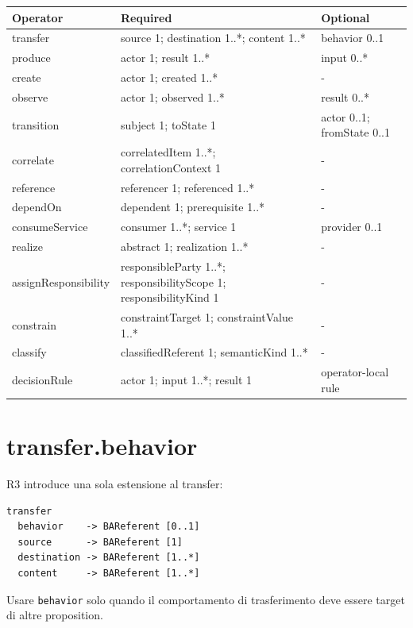 \documentclass[11pt,a4paper]{article}
\newcommand{\code}[1]{\nolinkurl{#1}}
\begin{document}
\begin{longtable}{L{0.19\textwidth}L{0.33\textwidth}L{0.34\textwidth}}
\toprule
\textbf{Operator} & \textbf{Required} & \textbf{Optional} \\
\midrule\endhead
transfer & source 1; destination 1..*; content 1..* & behavior 0..1 \\
produce & actor 1; result 1..* & input 0..* \\
create & actor 1; created 1..* & - \\
observe & actor 1; observed 1..* & result 0..* \\
transition & subject 1; toState 1 & actor 0..1; fromState 0..1 \\
correlate & correlatedItem 1..*; correlationContext 1 & - \\
reference & referencer 1; referenced 1..* & - \\
dependOn & dependent 1; prerequisite 1..* & - \\
consumeService & consumer 1..*; service 1 & provider 0..1 \\
realize & abstract 1; realization 1..* & - \\
assignResponsibility & responsibleParty 1..*; responsibilityScope 1; responsibilityKind 1 & - \\
constrain & constraintTarget 1; constraintValue 1..* & - \\
classify & classifiedReferent 1; semanticKind 1..* & - \\
decisionRule & actor 1; input 1..*; result 1 & operator-local rule \\
\bottomrule
\end{longtable}

\section{transfer.behavior}

R3 introduce una sola estensione al transfer:

\begin{lstlisting}
transfer
  behavior    -> BAReferent [0..1]
  source      -> BAReferent [1]
  destination -> BAReferent [1..*]
  content     -> BAReferent [1..*]
\end{lstlisting}

Usare \code{behavior} solo quando il comportamento di trasferimento deve essere target di altre proposition.
\end{document}
